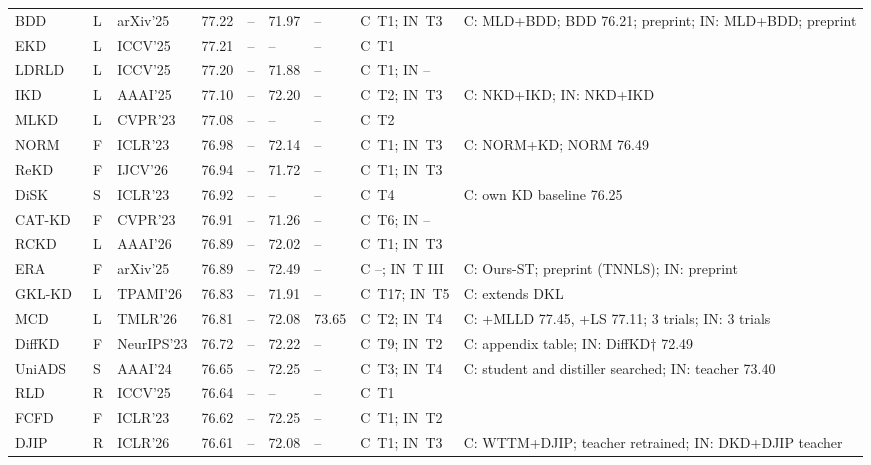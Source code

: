 {\begin{longtable}{@{}lllllll>{\raggedright\arraybackslash}p{1.5cm}>{\raggedright\arraybackslash}p{3.8cm}@{}}
BDD~\citep{qi2025bdd} & L & arXiv'25 & 77.22 & -- & 71.97 & -- & C~T1; IN~T3 & C: MLD+BDD; BDD 76.21; preprint; IN: MLD+BDD; preprint \\
EKD~\citep{xiang2025ekd} & L & ICCV'25 & 77.21 & -- & -- & -- & C~T1 &  \\
LDRLD~\citep{xu2025ldrld} & L & ICCV'25 & 77.20 & -- & 71.88 & -- & C~T1; IN -- &  \\
IKD~\citep{wang2025ikd} & L & AAAI'25 & 77.10 & -- & 72.20 & -- & C~T2; IN~T3 & C: NKD+IKD; IN: NKD+IKD \\
MLKD~\citep{jin2023mlkd} & L & CVPR'23 & 77.08 & -- & -- & -- & C~T2 &  \\
NORM~\citep{liu2023norm} & F & ICLR'23 & 76.98 & -- & 72.14 & -- & C~T1; IN~T3 & C: NORM+KD; NORM 76.49 \\
ReKD~\citep{qu2026rekd} & F & IJCV'26 & 76.94 & -- & 71.72 & -- & C~T1; IN~T3 &  \\
DiSK~\citep{kag2023disk} & S & ICLR'23 & 76.92 & -- & -- & -- & C~T4 & C: own KD baseline 76.25 \\
CAT-KD~\citep{guo2023catkd} & F & CVPR'23 & 76.91 & -- & 71.26 & -- & C~T6; IN -- &  \\
RCKD~\citep{wang2026rckd} & L & AAAI'26 & 76.89 & -- & 72.02 & -- & C~T1; IN~T3 &  \\
ERA~\citep{yan2025era} & F & arXiv'25 & 76.89 & -- & 72.49 & -- & C --; IN~T III & C: Ours-ST; preprint (TNNLS); IN: preprint \\
GKL-KD~\citep{cui2026gkl} & L & TPAMI'26 & 76.83 & -- & 71.91 & -- & C~T17; IN~T5 & C: extends DKL \\
MCD~\citep{mishra2026mcd} & L & TMLR'26 & 76.81 & -- & 72.08 & 73.65 & C~T2; IN~T4 & C: +MLLD 77.45, +LS 77.11; 3 trials; IN: 3 trials \\
DiffKD~\citep{huang2023diffkd} & F & NeurIPS'23 & 76.72 & -- & 72.22 & -- & C~T9; IN~T2 & C: appendix table; IN: DiffKD$\dagger$ 72.49 \\
UniADS~\citep{lu2024uniads} & S & AAAI'24 & 76.65 & -- & 72.25 & -- & C~T3; IN~T4 & C: student and distiller searched; IN: teacher 73.40 \\
RLD~\citep{sun2025rld} & R & ICCV'25 & 76.64 & -- & -- & -- & C~T1 &  \\
FCFD~\citep{liu2023fcfd} & F & ICLR'23 & 76.62 & -- & 72.25 & -- & C~T1; IN~T2 &  \\
DJIP~\citep{chen2026djip} & R & ICLR'26 & 76.61 & -- & 72.08 & -- & C~T1; IN~T3 & C: WTTM+DJIP; teacher retrained; IN: DKD+DJIP teacher \\

\end{longtable}}
